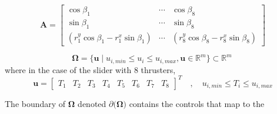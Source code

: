 \begin{equation}
    \boldsymbol{A} =
    \begin{bmatrix}
        \cos\beta_1 & \cdots & \cos\beta_8 \\[4pt]
        \sin\beta_1 & \cdots & \sin\beta_8 \\[4pt]
        (r^y_1 \cos\beta_1 - r^x_1 \sin\beta_1) & \cdots & (r^y_8 \cos\beta_8 - r^x_8 \sin\beta_8)
    \end{bmatrix}
\end{equation}





\[
    \boldsymbol{\Omega} = \{ \boldsymbol{u} \mid u_{i,min} \le u_i \le u_{i,max}, \boldsymbol{u} \in \mathbb{R}^m \} \subset \mathbb{R}^m \
\]
where in the case of the slider with 8 thrusters,
\[
    \boldsymbol{u} = \begin{bmatrix}  T_1 & T_2 & T_3 & T_4 & T_5 & T_6 & T_7& T_8 \end{bmatrix}^T
    \quad , \quad u_{i,min} \le T_i \le u_{i,max}
\]

The boundary of $\boldsymbol{\Omega}$ denoted $\partial(\boldsymbol{\Omega)}$ contains the controls that map to the 


